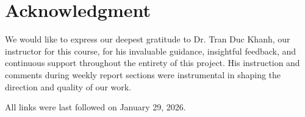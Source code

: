 \documentclass[conference,a4paper,english]{IEEEtran}[2015/08/26]
\begin{document}


% 









\section*{Acknowledgment}

We would like to express our deepest gratitude to Dr. Tran Duc Khanh, our instructor for this course, for his invaluable guidance, insightful feedback, and continuous support throughout the entirety of this project. His instruction and comments during weekly report sections were instrumental in shaping the direction and quality of our work.






%
\noindent
All links were last followed on January 29, 2026.
\end{document}
